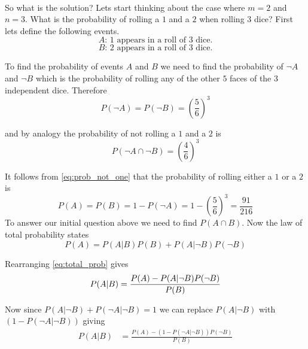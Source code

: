 \documentclass[12pt,a4paper]{article}
\begin{document}
\hrulefill\\

So what is the solution? Lets start thinking about the case where $m=2$ and $n=3$. What is the probability of rolling a $1$ and a $2$ when rolling $3$ dice? First lets define the following events.
\begin{equation*}
A \text{: 1 appears in a roll of 3 dice.}
\end{equation*}
\begin{equation*}
B \text{: 2 appears in a roll of 3 dice.}
\end{equation*}

To find the probability of events $A$ and $B$ we need to find the probability of $\neg A$ and $\neg B$ which is the probability of rolling any of the other $5$ faces of the $3$ independent dice. Therefore
\begin{equation}
P(\neg A) = P(\neg B) = \left(\frac{5}{6}\right)^3
\label{eq:prob_not_one}
\end{equation}

and by analogy the probability of not rolling a $1$ and a $2$ is
\begin{equation}
P(\neg A \cap \neg B) = \left(\frac{4}{6}\right)^3
\label{eq:prob_one_and_two}
\end{equation}

It follows from \cref{eq:prob_not_one} that the probability of rolling either a $1$ or a $2$ is
\begin{equation}
P(A) = P(B) = 1-P(\neg A) = 1 - \left(\frac{5}{6}\right)^3 = \frac{91}{216}
\end{equation}
To answer our initial question above we need to find $P(A \cap B)$. Now the law of total probability states
\begin{equation}
P(A) = P(A|B)P(B)+P(A|\neg B)P(\neg B)
\label{eq:total_prob}
\end{equation}

Rearranging \cref{eq:total_prob} gives
\begin{equation}
P(A|B)  = \frac{P(A) - P(A|\neg B)P(\neg B)}{P(B)}\\
\end{equation}

Now since $P(A|\neg B) + P(\neg A|\neg B) = 1$ we can replace $P(A|\neg B)$ with $(1 - P(\neg A|\neg B))$ giving 
\begin{align}
P(A|B)  &= \frac{P(A) - (1 - P(\neg A|\neg B))P(\neg B)}{P(B)}
\label{eq:A_cond_B}
\end{align}
\end{document}
